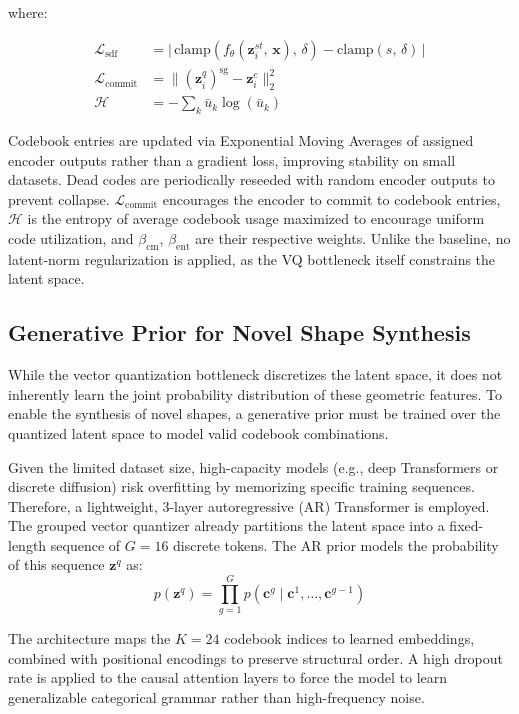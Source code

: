 \documentclass[11pt, a4paper]{article}
\begin{document}
where:

\begin{align}
    \mathcal{L}_{\mathrm{sdf}} &= \bigl|\,\mathrm{clamp}(f_\theta(\mathbf{z}_i^{st},\, \mathbf{x}),\, \delta) - \mathrm{clamp}(s,\, \delta)\,\bigr| \\
    \mathcal{L}_{\mathrm{commit}} &= \bigl\|(\mathbf{z}_i^q)^{\mathrm{sg}} - \mathbf{z}_i^e\bigr\|_2^2 \\
    \mathcal{H} &= -\sum_k \bar{u}_k \log(\bar{u}_k)
\end{align}

Codebook entries are updated via Exponential Moving Averages of assigned encoder outputs rather than a gradient loss, improving stability on small datasets. Dead codes are periodically reseeded with random encoder outputs to prevent collapse. $\mathcal{L}_{\mathrm{commit}}$ encourages the encoder to commit to codebook entries, $\mathcal{H}$ is the entropy of average codebook usage maximized to encourage uniform code utilization, and $\beta_{\mathrm{cm}}$, $\beta_{\mathrm{ent}}$ are their respective weights. Unlike the baseline, no latent-norm regularization is applied, as the VQ bottleneck itself constrains the latent space.

\subsection{Generative Prior for Novel Shape Synthesis}
While the vector quantization bottleneck discretizes the latent space, it does not inherently learn the joint probability distribution of these geometric features. To enable the synthesis of novel shapes, a generative prior must be trained over the quantized latent space to model valid codebook combinations.

Given the limited dataset size, high-capacity models (e.g., deep Transformers or discrete diffusion) risk overfitting by memorizing specific training sequences. Therefore, a lightweight, 3-layer autoregressive (AR) Transformer is employed. The grouped vector quantizer already partitions the latent space into a fixed-length sequence of $G=16$ discrete tokens. The AR prior models the probability of this sequence $\mathbf{z}^q$ as:$$p(\mathbf{z}^q) = \prod_{g=1}^{G} p(\mathbf{c}^g \mid \mathbf{c}^1, \dots, \mathbf{c}^{g-1})$$

The architecture maps the $K=24$ codebook indices to learned embeddings, combined with positional encodings to preserve structural order. A high dropout rate is applied to the causal attention layers to force the model to learn generalizable categorical grammar rather than high-frequency noise.
\end{document}
